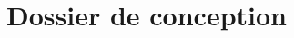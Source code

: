 



\title{Dossier de conception}


\maketitle
\tableofcontents
\listofalgorithms

\newpage


\newpage


%

